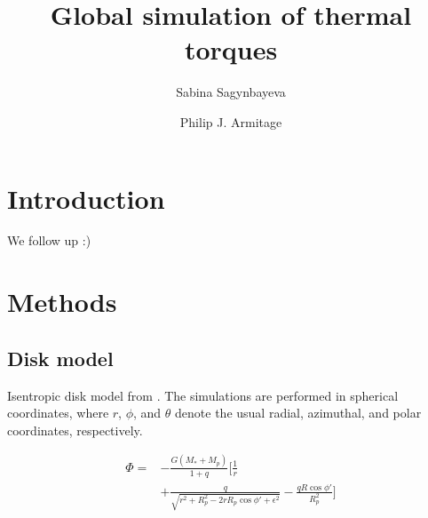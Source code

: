 \documentclass[twocolumn]{aastex631}
\begin{document}
\title{Global simulation of thermal torques}

\author[0000-0002-6650-3829]{Sabina Sagynbayeva}



\author[0000-0001-5032-1396]{Philip J. Armitage}


\begin{abstract}
   
\end{abstract}

\section{Introduction} 
\label{sec:intro}
We follow up \citet{hankla20} :)

\section{Methods}
\label{sec:methods}

\subsection{Disk model}
Isentropic disk model from \citet{Fung_2017}.
The simulations are performed in spherical coordinates, where $r$, $\phi$, and $\theta$ denote the usual radial, azimuthal, and polar coordinates, respectively. 

\begin{equation}\label{eq:potential}
\begin{aligned}
     \Phi = & -\frac{G(M_*+M_p)}{1+q} \bigg[\frac{1}{r} \\
     & + \frac{q}{\sqrt{r^2+R_p^2-2rR_p\cos{\phi'}+\epsilon^2}} - \frac{qR\cos{\phi'}}{R_p^2}\bigg] \\
\end{aligned}
\end{equation}
\end{document}
